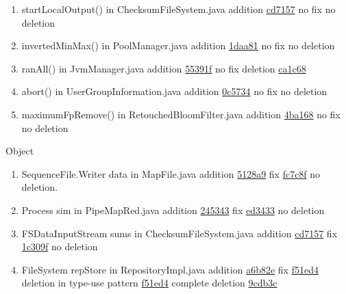 \begin{figure*}[!htb]
\begin{minipage}{1\textwidth}
\begin{enumerate}
\item  startLocalOutput() in ChecksumFileSystem.java addition \href{https://github.com/apache/hadoop/blob/3b85bd7c3391719624a261f061a67cc4356be477/hadoop-common-project/hadoop-common/src/main/java/org/apache/hadoop/fs/ChecksumFileSystem.java}{cd7157} no fix no deletion
\item  invertedMinMax() in PoolManager.java addition  \href{https://github.com/apache/hadoop/commit/1daa81#diff-13924c43e3ff5852da014b5005422666}{1daa81} no fix no deletion
\item  ranAll() in JvmManager.java  addition \href{https://github.com/apache/hadoop/commit/55391f#diff-b7bcf8118ef56aa71a37a08b9479afd5}{55391f} no fix deletion \href{https://github.com/apache/hadoop/commit/ca1c68}{ca1c68}
\item  abort() in UserGroupInformation.java addition \href{https://github.com/apache/hadoop/commit/0c5734e4aca873f405fbf994e5fe7061e31731c8#diff-8da26f813ae9e87bbf0fb9abb349acc2}{0c5734}  no fix no deletion
\item  maximumFpRemove() in RetouchedBloomFilter.java  addition \href{https://github.com/apache/hadoop/commit/4ba168e4873c30574d18541b53b8821f62bd2589#diff-fa311023e9175bac1e31055102b7331f}{4ba168} no fix no deletion
\end{enumerate}
Object
\begin{enumerate}
\item  SequenceFile.Writer data in MapFile.java addition \href{https://github.com/apache/hadoop/commit/5128a9a453d}{5128a9}   fix \href{https://github.com/apache/hadoop/commit/fc7c8f9#diff-34d704a739ee5bdbee9bb5cd1426972b}{fc7c8f} no deletion.
\item Process sim in PipeMapRed.java  addition \href{https://github.com/apache/hadoop/commit/2453431f642db9d38058b0227fd7636c162020e0#diff-72f498fd913780670fc13711bc524734}{245343}   fix  \href{https://github.com/apache/hadoop/commit/ed3433072#diff-72f498fd913780670fc13711bc524734}{ed3433} no deletion
\item  FSDataInputStream sums in ChecksumFileSystem.java  addition \href{https://github.com/apache/hadoop/commit/cd7157784e5e5ddc4e77144d042e54dd0d04bac1#diff-16cbdb68a1f1e17dcc9f848ee6084e0c}{cd7157}  fix \href{https://github.com/apache/hadoop/commit/1c309f763be3dd2e3d7d1616d2c960ff80cf9b03#diff-16cbdb68a1f1e17dcc9f848ee6084e0c}{1c309f}  no deletion
\item  FileSystem repStore in RepositoryImpl.java addition \href{https://github.com/apache/jackrabbit/commit/a6b82e}{a6b82e}  fix  \href{https://github.com/apache/jackrabbit/commit/f51ed4d48a#diff-9751fd2ad72989dbc11c7caca47e907c}{f51ed4} deletion in type-use pattern \href{https://github.com/apache/jackrabbit/commit/f51ed4#diff-9751fd2ad72989dbc11c7caca47e907c}{f51ed4} complete deletion \href{https://github.com/apache/jackrabbit/commit/9cdb3c#diff-9751fd2ad72989dbc11c7caca47e907c}{9cdb3c}

\end{enumerate}
\end{minipage}
\end{figure*}
